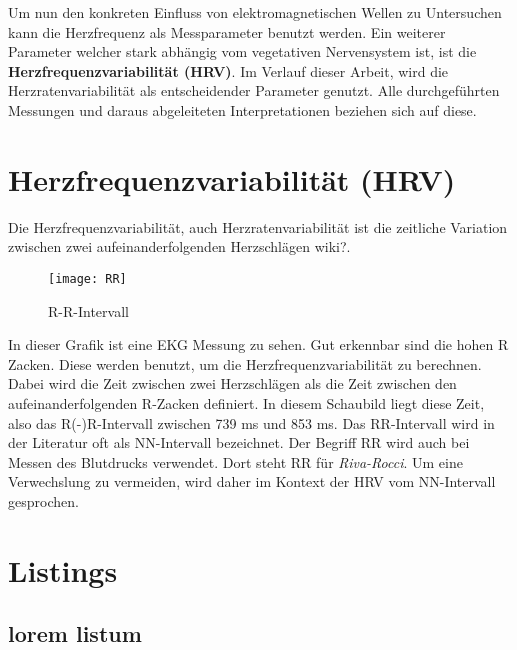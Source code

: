 \color{red} Um nun den konkreten Einfluss von elektromagnetischen Wellen zu Untersuchen kann die Herzfrequenz als Messparameter benutzt werden. Ein weiterer Parameter welcher stark abhängig vom vegetativen Nervensystem ist, ist die \textbf{Herzfrequenzvariabilität (HRV)}. Im Verlauf dieser Arbeit, wird die Herzratenvariabilität als entscheidender Parameter genutzt. Alle durchgeführten Messungen und daraus abgeleiteten Interpretationen beziehen sich auf diese. 
\color{black}

\section{Herzfrequenzvariabilität (HRV)}

Die Herzfrequenzvariabilität, auch Herzratenvariabilität ist die zeitliche Variation zwischen zwei aufeinanderfolgenden Herzschlägen \color{red}wiki?\color{black}.

\begin{figure}[!htbp]
    \centering
    \texttt{[image: RR]}
    \caption{R-R-Intervall}
    \label{fig:R-R-Intervall}
\end{figure}

In dieser Grafik ist eine EKG Messung zu sehen. Gut erkennbar sind die hohen R Zacken. Diese werden benutzt, um die Herzfrequenzvariabilität zu berechnen. Dabei wird die Zeit zwischen zwei Herzschlägen als die Zeit zwischen den aufeinanderfolgenden R-Zacken definiert. In diesem Schaubild liegt diese Zeit, also das R(-)R-Intervall zwischen 739 ms und 853 ms. Das RR-Intervall wird in der Literatur oft als NN-Intervall bezeichnet. Der Begriff RR wird auch bei Messen des Blutdrucks verwendet. Dort steht RR für \textit{Riva-Rocci}. Um eine Verwechslung zu vermeiden, wird daher im Kontext der HRV vom NN-Intervall gesprochen.




\section{Listings}
\subsection{lorem listum}

\begin{lstlisting}[caption={Einbinden von Code aus externer Datei mit Angabe eines Zeilenbereichs},label=inputFromFile]

\end{lstlisting}

